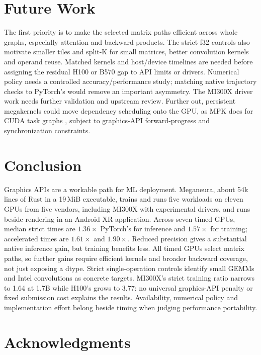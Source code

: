 \documentclass[conference]{IEEEtran}
\newcommand{\system}{Meganeura}
\begin{document}
\section{Future Work}

The first priority is to make the selected matrix paths efficient across
whole graphs, especially attention and backward products. The strict-f32
controls also motivate smaller tiles and split-K for small matrices, better
convolution kernels and operand reuse. Matched kernels and host/device
timelines are needed before assigning the residual H100 or B570 gap to API
limits or drivers. Numerical policy needs a controlled accuracy/performance
study; matching native trajectory checks to PyTorch's would remove an
important asymmetry.
The MI300X driver work needs further validation
and upstream review. Further out, persistent megakernels could move
dependency scheduling onto the GPU, as MPK does for CUDA task graphs
\cite{cheng2026mpk}, subject to graphics-API forward-progress and
synchronization constraints.

\section{Conclusion}

Graphics APIs are a workable path for ML deployment. \system{}, about 54k
lines of Rust in a 19\,MiB executable, trains and runs five workloads on
eleven GPUs from five vendors, including MI300X with experimental drivers,
and runs beside rendering in an Android XR application. Across seven timed
GPUs, median strict times are $1.36\times$ PyTorch's for inference and
$1.57\times$ for training; accelerated times are $1.61\times$ and
$1.90\times$. Reduced precision gives a substantial native inference gain,
but training benefits less. All timed GPUs select matrix paths, so further
gains require efficient kernels and broader backward coverage, not just
exposing a dtype. Strict single-operation controls identify small GEMMs and
Intel convolutions as concrete targets. MI300X's strict training ratio
narrows to 1.64 at 1.7B while H100's grows to 3.77: no universal graphics-API
penalty or fixed submission cost explains the results. Availability,
numerical policy and implementation effort belong beside timing when
judging performance portability.

\section*{Acknowledgments}
\end{document}
